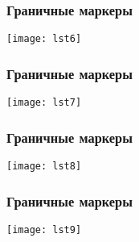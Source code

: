 \begin{frame}
\frametitle{Граничные маркеры}
\texttt{[image: lst6]}
\end{frame}

\begin{frame}
\frametitle{Граничные маркеры}
\texttt{[image: lst7]}
\end{frame}

\begin{frame}
\frametitle{Граничные маркеры}
\texttt{[image: lst8]}
\end{frame}

\begin{frame}
\frametitle{Граничные маркеры}
\texttt{[image: lst9]}
\end{frame}

